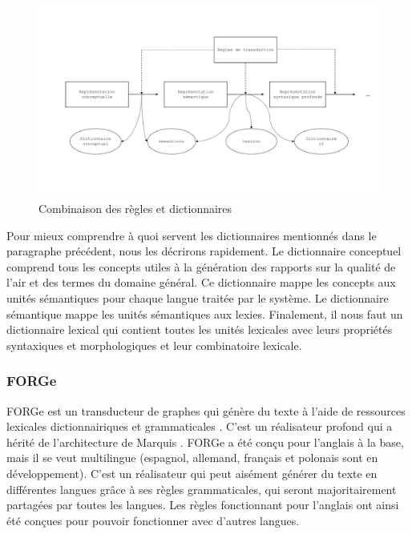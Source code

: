 \begin{figure}[htb]
	\centering
	\includegraphics[width=1\textwidth, trim = {0cm 0cm 0cm 0cm},clip]{ch2/figs/module.pdf}
	\caption{Combinaison des règles et dictionnaires}
	\label{fig:reglesdict}
\end{figure}

Pour mieux comprendre à quoi servent les dictionnaires mentionnés dans le paragraphe précédent, nous les décrirons rapidement. Le dictionnaire conceptuel comprend tous les concepts utiles à la génération des rapports sur la qualité de l'air et des termes du domaine général. Ce dictionnaire mappe les concepts aux unités sémantiques pour chaque langue traitée par le système. Le dictionnaire sémantique mappe les unités sémantiques aux lexies. Finalement, il nous faut un dictionnaire lexical qui contient toutes les unités lexicales avec leurs propriétés syntaxiques et morphologiques et leur combinatoire lexicale.

\subsubsection{FORGe}
FORGe est un transducteur de graphes qui génère du texte à l'aide de ressources lexicales dictionnairiques et grammaticales \citep{MilledemoFORGePompeu2017,DBLP:conf/semeval/MilleCBW17}. C'est un réalisateur profond qui a hérité de l'architecture de Marquis \citep{WannerMARQUISGENERATIONUSERTAILORED2010}. FORGe a été conçu pour l'anglais à la base, mais il se veut multilingue (espagnol, allemand, français et polonais sont en développement). C'est un réalisateur qui peut aisément générer du texte en différentes langues grâce à ses règles grammaticales, qui seront majoritairement partagées par toutes les langues. Les règles fonctionnant pour l'anglais ont ainsi été conçues pour pouvoir fonctionner avec d'autres langues.

